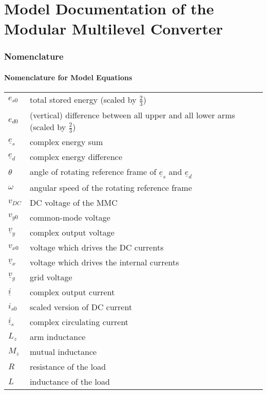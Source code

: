 \documentclass[10pt,a4paper]{article}
\begin{document}
	\part*{Model Documentation of the \\Modular Multilevel Converter}


	\section{Nomenclature}
	\subsection{Nomenclature for Model Equations}
	
	\begin{tabular}{ll}
		$e_{s0}$ & total	stored energy (scaled by $\frac{2}{3}$)\\
		$e_{d0}$ & (vertical)	difference between all upper and all lower arms (scaled by $\frac{2}{3}$)\\
		$\underline{e}_s$ & complex energy sum\\
		$\underline{e}_d$ & complex energy difference\\
		$\theta$ & angle of rotating reference frame of $\underline{e}_s$ and $\underline{e}_d$\\
		$\omega$ & angular speed of the rotating reference frame \\
		$v_{DC}$ & DC voltage of the MMC\\
		$v_{y0}$ & common-mode voltage\\
		$\underline{v}_y$ & complex output voltage\\
		$v_{x0}$ & voltage which drives the DC currents \\
		$\underline{v}_x$ & voltage which drives the internal currents \\		
		$\underline{v}_g$ & grid voltage \\
		$\underline{i}$ & complex output current\\
		$i_{s0}$ & scaled version of DC current \\
		$\underline{i}_s$ & complex circulating current\\
		$L_z$ & arm inductance \\
		$M_z$ & mutual inductance \\
		$R$ & resistance of the load \\
		$L$ & inductance of the load		
	\end{tabular}
\end{document}
